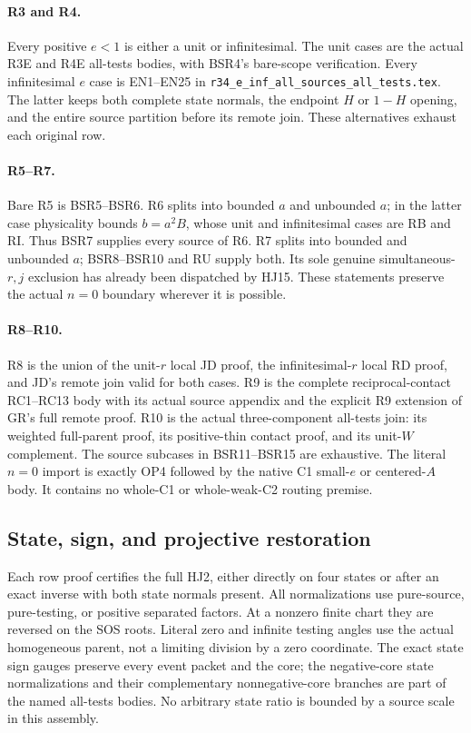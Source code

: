 \paragraph{R3 and R4.}
Every positive \(e<1\) is either a unit or
infinitesimal.  The unit cases are the actual
R3E and R4E all-tests bodies, with BSR4's
bare-scope verification.  Every infinitesimal
\(e\) case is EN1--EN25 in
\texttt{r34\_e\_inf\_all\_sources\_all\_tests.tex}.
The latter keeps both complete state normals,
the endpoint \(H\) or \(1-H\) opening, and the
entire source partition before its remote join.
These alternatives exhaust each original row.

\paragraph{R5--R7.}
Bare R5 is BSR5--BSR6.
R6 splits into bounded \(a\) and unbounded \(a\);
in the latter case physicality bounds \(b=a^2B\),
whose unit and infinitesimal cases are RB and RI.
Thus BSR7 supplies every source of R6.
R7 splits into bounded and unbounded \(a\);
BSR8--BSR10 and RU supply both.
Its sole genuine simultaneous-\(r,j\) exclusion
has already been dispatched by HJ15.
These statements preserve the actual \(n=0\)
boundary wherever it is possible.

\paragraph{R8--R10.}
R8 is the union of the unit-\(r\) local JD proof,
the infinitesimal-\(r\) local RD proof, and JD's
remote join valid for both cases.
R9 is the complete reciprocal-contact RC1--RC13
body with its actual source appendix and the
explicit R9 extension of GR's full remote proof.
R10 is the actual three-component all-tests join:
its weighted full-parent proof, its positive-thin
contact proof, and its unit-\(W\) complement.
The source subcases in BSR11--BSR15 are exhaustive.
The literal \(n=0\) import is exactly OP4 followed
by the native C1 small-\(e\) or centered-\(A\)
body.  It contains no whole-C1 or whole-weak-C2
routing premise.

\subsection{State, sign, and projective restoration}

Each row proof certifies the full HJ2, either directly
on four states or after an exact inverse with both
state normals present.
All normalizations use pure-source, pure-testing,
or positive separated factors.
At a nonzero finite chart they are reversed on
the SOS roots.  Literal zero and infinite testing
angles use the actual homogeneous parent, not a
limiting division by a zero coordinate.
The exact state sign gauges preserve every event
packet and the core; the negative-core state
normalizations and their complementary
nonnegative-core branches are part of the named
all-tests bodies.
No arbitrary state ratio is bounded by a source
scale in this assembly.

